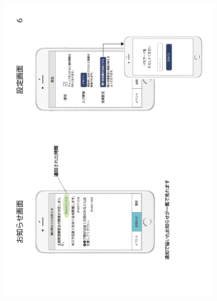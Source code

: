 \begin{figure}[h]
    \begin{center}
    \includegraphics[keepaspectratio, scale=0.7]{appendixs/appendixB_figres/fig6.png}
    \end{center}
\end{figure}

